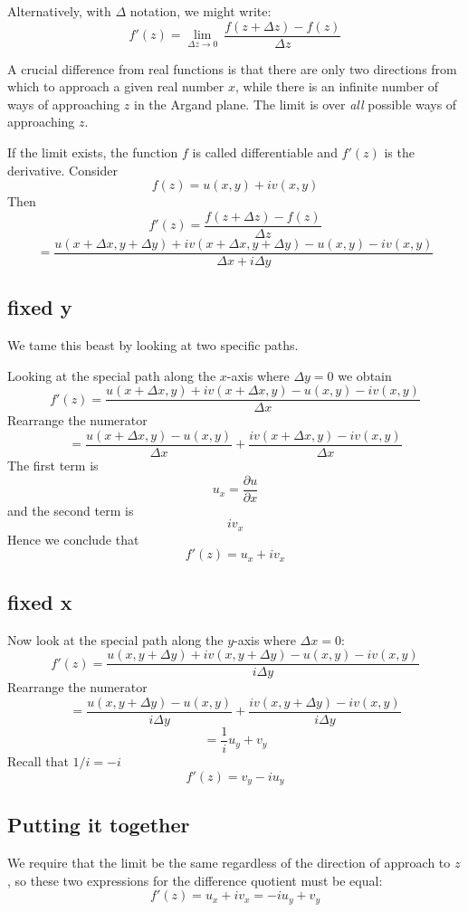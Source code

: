 \documentclass[11pt, oneside]{article}
\begin{document}
Alternatively, with $\Delta$ notation, we might write:
\[ f'(z) = \lim_{\Delta z \rightarrow 0} \ \frac{f(z + \Delta z) - f(z)}{\Delta z} \]

A crucial difference from real functions is that there are only two directions from which to approach a given real number $x$, while there is an infinite number of ways of approaching $z$ in the Argand plane.  The limit is over \emph{all} possible ways of approaching $z$.  

If the limit exists, the function $f$ is called differentiable and $f'(z)$ is the derivative.
Consider
\[ f(z) = u(x,y) + i v(x,y) \]
Then
\[ f'(z) = \frac{f(z + \Delta z) - f(z)}{\Delta z} \]
\[ = \frac{u(x + \Delta x, y + \Delta y) + i v (x + \Delta x, y + \Delta y) - u(x,y) - i v(x,y)}{\Delta x + i \Delta y} \]

\subsection*{fixed y}
We tame this beast by looking at two specific paths.

Looking at the special path along the $x$-axis where $\Delta y = 0$ we obtain
\[ f'(z) = \frac{u(x + \Delta x, y) + i v (x + \Delta x, y) - u(x,y) - i v(x,y)}{\Delta x} \]
Rearrange the numerator
\[ = \frac{u(x + \Delta x, y) - u(x,y)}{\Delta x} + \frac{i v (x + \Delta x, y) - i v(x,y)}{\Delta x} \]
The first term is
\[ u_x = \frac{\partial u}{\partial x} \]
and the second term is 
\[ i v_x \]
Hence we conclude that
\[ f'(z) = u_x + i v_x \]

\subsection*{fixed x}
Now look at the special path along the $y$-axis where $\Delta x = 0$:
\[ f'(z) = \frac{u(x, y + \Delta y) + i v (x, y + \Delta y) - u(x,y) - i v(x,y)}{i \Delta y} \]
Rearrange the numerator
\[ = \frac{u(x, y + \Delta y) - u(x,y)}{i \Delta y} + \frac{i v (x, y + \Delta y) - i v(x,y)}{i \Delta y} \]
\[ = \frac{1}{i} u_y + v_y \]
Recall that $1/i = -i$
\[ f'(z) = v_y - i u_y \]

\subsection*{Putting it together}
We require that the limit be the same regardless of the direction of approach to $z$, so these two expressions for the difference quotient must be equal:
\[ f'(z) = u_x + i v_x = - i u_y + v_y \]
\end{document}
